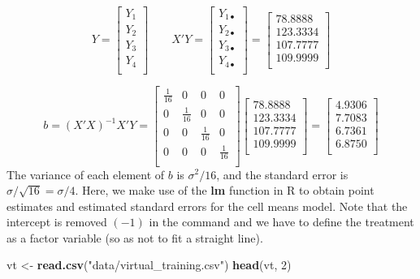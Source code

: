 \documentclass[
]{book}
\newenvironment{Shaded}{\begin{snugshade}}{\end{snugshade}}
\newcommand{\DecValTok}[1]{\textcolor[rgb]{0.00,0.00,0.81}{#1}}
\newcommand{\FunctionTok}[1]{\textcolor[rgb]{0.13,0.29,0.53}{\textbf{#1}}}
\newcommand{\NormalTok}[1]{#1}
\newcommand{\OtherTok}[1]{\textcolor[rgb]{0.56,0.35,0.01}{#1}}
\newcommand{\StringTok}[1]{\textcolor[rgb]{0.31,0.60,0.02}{#1}}
\begin{document}
\[ 
Y = 
\begin{bmatrix}
Y_1 \\ Y_2 \\ Y_3 \\ Y_4\\
\end{bmatrix}
\qquad
X'Y =
\begin{bmatrix}
Y_{1\bullet} \\
Y_{2\bullet} \\
Y_{3\bullet} \\
Y_{4\bullet} \\
\end{bmatrix}
=
\begin{bmatrix}
78.8888 \\ 123.3334 \\ 107.7777 \\109.9999 \\
\end{bmatrix}
\]

\[
b=(X'X)^{-1}X'Y
=
\begin{bmatrix}
\frac{1}{16} & 0 & 0 & 0 \\
0 & \frac{1}{16} & 0 & 0\\
0 & 0 & \frac{1}{16} & 0 \\
0 & 0 & 0 & \frac{1}{16}\\
\end{bmatrix}
\begin{bmatrix}
78.8888 \\ 123.3334 \\ 107.7777 \\109.9999 \\
\end{bmatrix}
=
\begin{bmatrix}
4.9306 \\ 7.7083 \\ 6.7361 \\ 6.8750 \\
\end{bmatrix}
\] The variance of each element of \(b\) is \(\sigma^2/16\), and the
standard error is \(\sigma/\sqrt{16}=\sigma/4\). Here, we make use of
the \textbf{lm} function in R to obtain point estimates and estimated
standard errors for the cell means model. Note that the intercept is
removed \((-1)\) in the command and we have to define the treatment as a
factor variable (so as not to fit a straight line).

\begin{Shaded}
\begin{Highlighting}[]
\NormalTok{vt }\OtherTok{\textless{}{-}} \FunctionTok{read.csv}\NormalTok{(}\StringTok{"data/virtual\_training.csv"}\NormalTok{)}
\FunctionTok{head}\NormalTok{(vt, }\DecValTok{2}\NormalTok{)}
\end{Highlighting}
\end{Shaded}
\end{document}
